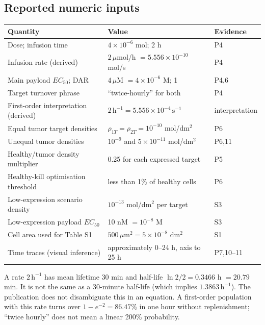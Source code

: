 \documentclass[11pt,a4paper]{article}
\begin{document}
\subsection{Reported numeric inputs}
\begin{longtable}{p{.45\linewidth}p{.35\linewidth}p{.14\linewidth}}
\toprule Quantity & Value & Evidence\\\midrule\endhead
Dose; infusion time & $4\times10^{-6}$ mol; 2 h & P4\\
Infusion rate (derived) & $2\,\mu$mol/h $=5.556\times10^{-10}$ mol/s & P4\\
Main payload $EC_{50}$; DAR & $4\,\mu$M $=4\times10^{-6}$ M; 1 & P4,6\\
Target turnover phrase & ``twice-hourly'' for both & P4\\
First-order interpretation (derived) & $2\,\mathrm{h^{-1}}=5.556\times10^{-4}\,\mathrm{s^{-1}}$ & interpretation\\
Equal tumor target densities & $\rho_{1T}=\rho_{2T}=10^{-10}$ mol/dm$^2$ & P6\\
Unequal tumor densities & $10^{-9}$ and $5\times10^{-11}$ mol/dm$^2$ & P6,11\\
Healthy/tumor density multiplier & 0.25 for each expressed target & P5\\
Healthy-kill optimisation threshold & less than 1\% of healthy cells & P6\\
Low-expression scenario density & $10^{-13}$ mol/dm$^2$ per target & S3\\
Low-expression payload $EC_{50}$ & 10 nM $=10^{-8}$ M & S3\\
Cell area used for Table S1 & $500\,\mu\mathrm m^2=5\times10^{-8}$ dm$^2$ & S1\\
Time traces (visual inference) & approximately 0--24 h, axis to 25 h & P7,10--11\\
\bottomrule
\end{longtable}
A rate $2\,\mathrm{h^{-1}}$ has mean lifetime 30 min and half-life $\ln 2/2=0.3466$ h $=20.79$ min. It is not the same as a 30-minute half-life (which implies $1.3863\,\mathrm{h^{-1}}$). The publication does not disambiguate this in an equation. A first-order population with this rate turns over $1-e^{-2}=86.47\%$ in one hour without replenishment; ``twice hourly'' does not mean a linear 200\% probability.
\end{document}
